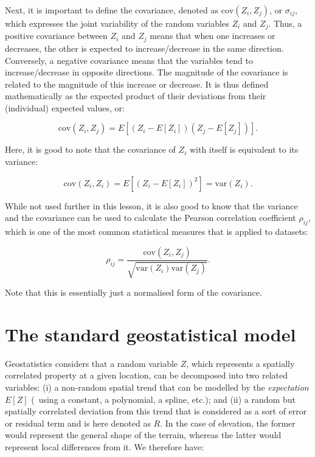 Next, it is important to define the covariance, denoted as \(\mathrm{cov}(Z_i,Z_j)\), or \(\sigma_{ij}\), which expresses the joint variability of the random variables \(Z_i\) and \(Z_j\).
Thus, a positive covariance between \(Z_i\) and \(Z_j\) means that when one increases or decreases, the other is expected to increase/decrease in the same direction.
Conversely, a negative covariance means that the variables tend to increase/decrease in opposite directions.
The magnitude of the covariance is related to the magnitude of this increase or decrease.
It is thus defined mathematically as the expected product of their deviations from their (individual) expected values, or:

\begin{equation}
\label{eq:covariance}
\mathrm{cov}(Z_i,Z_j) = E\left[\left(Z_i-E[Z_i]\right)\left(Z_j-E[Z_j]\right)\right].
\end{equation}

Here, it is good to note that the covariance of \(Z_i\) with itself is equivalent to its variance:

\begin{equation}
\mathrm{cov}(Z_i,Z_i) = E\left[\left(Z_i-E[Z_i]\right)^2\right] = \mathrm{var}(Z_i). \nonumber
\end{equation}

While not used further in this lesson, it is also good to know that the variance and the covariance can be used to calculate the Pearson correlation coefficient \(\rho_{ij}\), which is one of the most common statistical measures that is applied to datasets:

\begin{equation}
\rho_{ij}=\frac{\mathrm{cov}(Z_i, Z_j)}{\sqrt{\mathrm{var}(Z_i) \mathrm{var}(Z_j)}}. \nonumber
\end{equation}

Note that this is essentially just a normalised form of the covariance.

\section[Geostatistical model]{The standard geostatistical model}

Geostatistics considers that a random variable \(Z\), which represents a spatially correlated property at a given location, can be decomposed into two related variables: (i) a non-random spatial trend that can be modelled by the \emph{expectation} \(E[Z]\) (\eg\ using a constant, a polynomial, a spline, etc.); and (ii) a random but spatially correlated deviation from this trend that is considered as a sort of error or residual term and is here denoted as \(R\).
In the case of elevation, the former would represent the general shape of the terrain, whereas the latter would represent local differences from it.
We therefore have:

